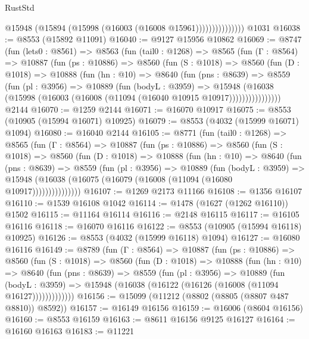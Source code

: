 \begin{lexlean}{RustStd}
\begin{coremodule}
                        @15948 (@15894 (@15998 (@16003 (@16008 @15961)))))))))))))))
    @1031
@16038 := @8553 (@15892 @11091)
@16040 := @9127 @15956 @10862
@16069 := @8747
    (fun (lets0 : @8561) =>
    @8563
      (fun (tail0 : @1268) =>
      @8565
        (fun (Γ : @8564) =>
        @10887
          (fun (ps : @10886) =>
          @8560
            (fun (S : @1018) =>
            @8560
              (fun (D : @1018) =>
              @10888
                (fun (hn : @10) =>
                @8640
                  (fun (pns : @8639) =>
                  @8559
                    (fun (pl : @3956) =>
                    @10889
                      (fun (bodyL : @3959) =>
                      @15948
                        (@16038
                          (@15998 (@16003 (@16008 (@11094 (@16040 @10915 @10917))))))))))))))))
    @2144
@16070 := @1259 @2144
@16071 := @16070 @10917
@16075 := @8553 (@10905 (@15994 @16071) @10925)
@16079 := @8553 (@4032 (@15999 @16071) @1094)
@16080 := @16040 @2144
@16105 := @8771
    (fun (tail0 : @1268) =>
    @8565
      (fun (Γ : @8564) =>
      @10887
        (fun (ps : @10886) =>
        @8560
          (fun (S : @1018) =>
          @8560
            (fun (D : @1018) =>
            @10888
              (fun (hn : @10) =>
              @8640
                (fun (pns : @8639) =>
                @8559
                  (fun (pl : @3956) =>
                  @10889
                    (fun (bodyL : @3959) =>
                    @15948 (@16038 (@16075 (@16079 (@16008 (@11094 (@16080 @10917)))))))))))))))
@16107 := @1269 @2173 @11166
@16108 := @1356 @16107
@16110 := @1539 @16108 @1042
@16114 := @1478 (@1627 (@1262 @16110)) @1502
@16115 := @11164 @16114
@16116 := @2148 @16115
@16117 := @16105 @16116
@16118 := @16070 @16116
@16122 := @8553 (@10905 (@15994 @16118) @10925)
@16126 := @8553 (@4032 (@15999 @16118) @1094)
@16127 := @16080 @16116
@16149 := @8789
    (fun (Γ : @8564) =>
    @10887
      (fun (ps : @10886) =>
      @8560
        (fun (S : @1018) =>
        @8560
          (fun (D : @1018) =>
          @10888
            (fun (hn : @10) =>
            @8640
              (fun (pns : @8639) =>
              @8559
                (fun (pl : @3956) =>
                @10889
                  (fun (bodyL : @3959) =>
                  @15948 (@16038 (@16122 (@16126 (@16008 (@11094 @16127)))))))))))))
@16156 := @15099 (@11212 (@8802 (@8805 (@8807 @487 @8810)) @8592))
@16157 := @16149 @16156
@16159 := @16006 (@8604 @16156)
@16160 := @8553 @16159
@16163 := @8611 @16156 @9125 @16127
@16164 := @16160 @16163
@16183 := @11221

\end{coremodule}
\end{lexlean}
